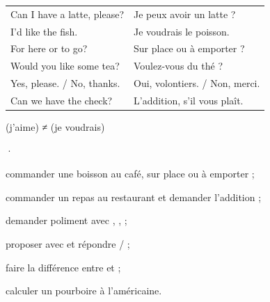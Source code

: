 \begin{essentiel}
\begin{minipage}[t]{0.56\linewidth}
\renewcommand{\arraystretch}{1.32}
\begin{tabular}{@{}>{\enOn\otSemi\fontsize{9.4}{11}\selectfont}l<{\enOff}@{\hspace{3mm}}>{\fontsize{9.2}{11}\selectfont\color{white!78!otNavy}}l@{}}
Can I have a latte, please?  & Je peux avoir un latte ?\\
I'd like the fish.           & Je voudrais le poisson.\\
For here or to go?           & Sur place ou à emporter ?\\
Would you like some tea?     & Voulez-vous du thé ?\\
Yes, please. / No, thanks.   & Oui, volontiers. / Non, merci.\\
Can we have the check?       & L'addition, s'il vous plaît.\\
\end{tabular}
\end{minipage}\hfill
\begin{minipage}[t]{0.39\linewidth}
{\par}
{\par
{\fontsize{9}{11.4}\selectfont\color{white!78!otNavy} (j'aime) ≠  (je voudrais)}\par}
{\fontsize{9.2}{11.6}\selectfont {}  ·  \par}
\end{minipage}
\end{essentiel}

\begin{jesais}
\item commander une boisson au café, sur place ou à emporter ;
\item commander un repas au restaurant et demander l'addition ;
\item demander poliment avec , ,  ;
\item proposer avec  et répondre  /  ;
\item faire la différence entre  et  ;
\item calculer un pourboire à l'américaine.
\end{jesais}

